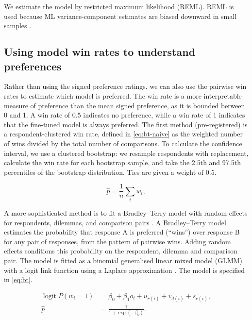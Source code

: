 We estimate the model by restricted maximum likelihood (REML). REML is used because ML variance-component estimates are biased downward in small samples \cite{pattersonRecoveryInterblockInformation1971}.

\subsection{Using model win rates to understand preferences}

Rather than using the signed preference ratings, we can also use the pairwise win rates to estimate which model is preferred. The win rate is a more interpretable measure of preference than the mean signed preference, as it is bounded between 0 and 1. A win rate of 0.5 indicates no preference, while a win rate of 1 indicates that the fine-tuned model is always preferred.
The first method (pre-registered) is a respondent-clustered win rate, defined in \eqref{eq:bt-naive} as the weighted number of wins divided by the total number of comparisons. To calculate the confidence interval, we use a clustered bootstrap: we resample respondents with replacement, calculate the win rate for each bootstrap sample, and take the 2.5th and 97.5th percentiles of the bootstrap distribution. Ties are given a weight of 0.5.

\begin{equation}
  \hat{p} = \frac{1}{n}\sum_i w_i,
  \label{eq:bt-naive}
\end{equation}

\noindent A more sophisticated method is to fit a Bradley–Terry model with random effects for respondents, dilemmas, and comparison pairs \cite{bradleyRANKANALYSISINCOMPLETE1952}. A Bradley–Terry model estimates the probability that response A is preferred (``wins'') over response B for any pair of responses, from the pattern of pairwise wins. Adding random effects conditions this probability on the respondent, dilemma and comparison pair. The model is fitted as a binomial generalised linear mixed model (GLMM) with a logit link function using a Laplace approximation \cite{breslowApproximateInferenceGeneralized1993}. The model is specified in \eqref{eq:bt}.

\begin{align}
  \operatorname{logit} P(w_i = 1) &= \beta_0 + \beta_1 o_i + u_{r(i)} + v_{d(i)} + s_{c(i)}, \label{eq:bt}\\
  \hat{p} &= \frac{1}{1 + \exp(-\beta_0)}.
\end{align}

